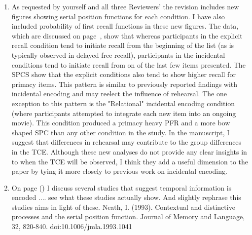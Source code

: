 \documentclass[12pt]{article}
\begin{document}
\begin{enumerate}
\item
	As requested by yourself and all three Reviewers' the revision includes new figures showing serial position functions for each condition. I have also included probability of first recall functions in these new figures. The data, which are discussed on page~\pageref{SPCtalk}, show that whereas participants in the explicit recall condition tend to initiate recall from the beginning of the list (as is typically observed in delayed free recall), participants in the incidental conditions tend to initiate recall from on of the last few items presented. The SPCS show that the explicit conditions also tend to show higher recall for primacy items. This pattern is similar to previously reported findings with incidental encoding \citep[][]{MarsWerd72,Neat93,GlenEtal80} and may reelect the influence of rehearsal. The one exception to this pattern is the "Relational" incidental encoding condition (where participants attempted to integrate each new item into an ongoing movie). This condition produced a primacy heavy PFR and a more bow shaped SPC than any other condition in the study. In the manuscript, I suggest that differences in rehearsal may contribute to the group differences in the TCE. Although these new analyses do not provide any clear insights in to when the TCE will be observed, I think they add a useful dimension to the paper by tying it more closely to previous work on incidental encoding.


\item
	On page (\pageref{TODO-8}) I discuss several studies that suggest temporal information is encoded .... see what these studies actually show. And slightly rephrase this studies aims in light of these.
	Neath, I. (1993). Contextual and distinctive processes and the serial position function. Journal of Memory and Language, 32, 820-840. doi:10.1006/jmla.1993.1041


\end{enumerate}
\end{document}
